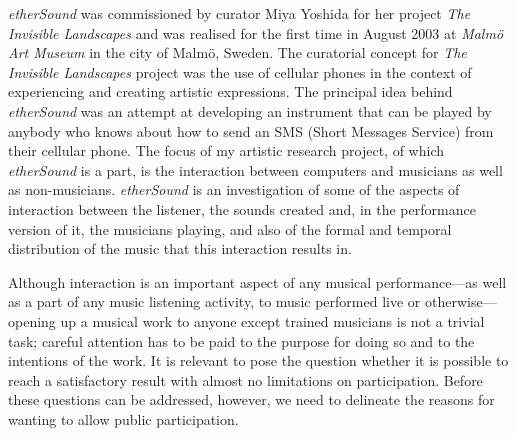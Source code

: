
\emph{etherSound} was commissioned by curator Miya Yoshida for her project \emph{The Invisible Landscapes} and was realised for the first time in August 2003 at \emph{Malm\"{o} Art Museum} in the city of Malm\"{o}, Sweden. The curatorial concept for \emph{The Invisible Landscapes}  project was the use of cellular phones in the context of experiencing and creating artistic expressions. The principal idea behind \emph{etherSound} was an attempt at developing an instrument that can be played by anybody who knows about how to send an SMS (Short Messages Service) from their cellular phone. The focus of my artistic research project, of which \emph{etherSound} is a part, is the interaction between computers and musicians as well as non-musicians. \emph{etherSound} is an investigation of some of the aspects of interaction between the listener, the sounds created and, in the performance version of it, the musicians playing, and also of the formal and temporal distribution of the music that this interaction results in. 

Although interaction is an important aspect of any musical performance---as well as a part of any music listening activity, to music performed live or otherwise---opening up a musical work to anyone except trained musicians is not a trivial task; careful attention has to be paid to the purpose for doing so and to the intentions of the work. It is relevant to pose the question whether it is possible to reach a satisfactory result with almost no limitations on participation. 
Before these questions can be addressed, however, we need to delineate the reasons for wanting to allow public participation. 

